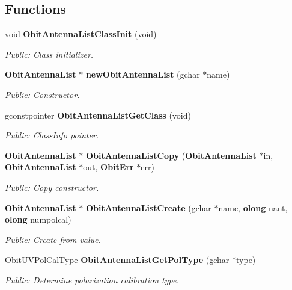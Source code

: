 \subsection*{Functions}
\begin{CompactItemize}
\item 
void {\bf Obit\-Antenna\-List\-Class\-Init} (void)
\begin{CompactList}\small\item\em Public: Class initializer. \item\end{CompactList}\item 
{\bf Obit\-Antenna\-List} $\ast$ {\bf new\-Obit\-Antenna\-List} (gchar $\ast$name)
\begin{CompactList}\small\item\em Public: Constructor. \item\end{CompactList}\item 
gconstpointer {\bf Obit\-Antenna\-List\-Get\-Class} (void)
\begin{CompactList}\small\item\em Public: Class\-Info pointer. \item\end{CompactList}\item 
{\bf Obit\-Antenna\-List} $\ast$ {\bf Obit\-Antenna\-List\-Copy} ({\bf Obit\-Antenna\-List} $\ast$in, {\bf Obit\-Antenna\-List} $\ast$out, {\bf Obit\-Err} $\ast$err)
\begin{CompactList}\small\item\em Public: Copy constructor. \item\end{CompactList}\item 
{\bf Obit\-Antenna\-List} $\ast$ {\bf Obit\-Antenna\-List\-Create} (gchar $\ast$name, {\bf olong} nant, {\bf olong} numpolcal)
\begin{CompactList}\small\item\em Public: Create from value. \item\end{CompactList}\item 
Obit\-UVPol\-Cal\-Type {\bf Obit\-Antenna\-List\-Get\-Pol\-Type} (gchar $\ast$type)
\begin{CompactList}\small\item\em Public: Determine polarization calibration type. \item\end{CompactList}\item 

\end{CompactItemize}
